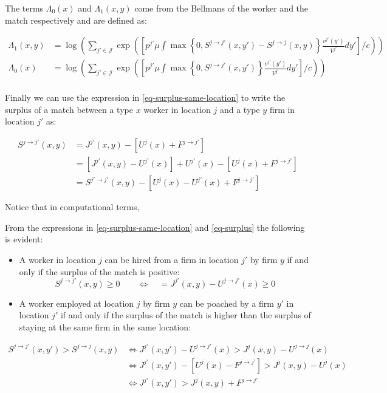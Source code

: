 \documentclass[
  letterpaper,
  DIV=11,
  numbers=noendperiod]{scrreprt}
\providecommand{\tightlist}{%
  \setlength{\itemsep}{0pt}\setlength{\parskip}{0pt}}\usepackage{longtable,booktabs,array}
\begin{document}
The terms \(\Lambda_0(x)\) and \(\Lambda_1(x,y)\) come from the Bellmans
of the worker and the match respectively and are defined as:

\begin{align*}
\Lambda_1(x, y) &= \log \left(\sum_{j'\in \mathcal{J}}\exp{\left(\left[p^{j'} \mu \int \max\left\{0, S^{j\to j' }(x,y')-S^{j \to j}(x,y) \right\}\frac{v^{ j' }(y')}{V^{j'}}dy' \right] / c\right)} \right)  \\
\Lambda_0(x) &= \log \left(\sum_{j'\in \mathcal{J}}\exp{\left(\left[p^{j'} \mu \int \max\left\{0, S^{j\to j' }(x,y') \right\}\frac{v^{ j' }(y')}{V^{j'}}dy' \right] / c\right)}\right) \\
\end{align*}

Finally we can use the expression in \eqref{eq-surplus-same-location} to
write the surplus of a match between a type \(x\) worker in location
\(j\) and a type \(y\) firm in location \(j'\) as:

\begin{align}\label{eq-surplus}
S^{j \to j'}(x,y) &= J^{j'}(x, y) - \left[U^{j}(x) + F^{j \to j'}\right] \\
& = [J^{j'}(x, y) - U^{j'}(x)] + U^{j'}(x) - \left[U^{j}(x) + F^{j \to j'}\right] \\
& = S^{j'\to j'}(x,y) - [U^{j}(x) - U^{j'}(x) + F^{j \to j'}]
\end{align}

Notice that in computational terms,

From the expressions in \eqref{eq-surplus-same-location} and
\eqref{eq-surplus} the following is evident:

\begin{itemize}
\tightlist
\item
  A worker in location \(j\) can be hired from a firm in location \(j'\)
  by firm \(y\) if and only if the surplus of the match is positive:
  \[S^{j\to j'}(x,y) \geq 0 \qquad \iff \quad = J^{j'}(x,y) - U^{j\to j'}(x) \geq 0\]
\item
  A worker employed at location \(j\) by firm \(y\) can be poached by a
  firm \(y'\) in location \(j'\) if and only if the surplus of the match
  is higher than the surplus of staying at the same firm in the same
  location:
\end{itemize}

\begin{align*}
S^{j\to j'}(x,y') > S^{j\to j}(x,y) &\iff J^{j'}(x,y') - U^{j\to j'}(x) > J^{j}(x,y) - U^{j\to j}(x) \\
&\iff J^{j'}(x,y') - [U^{j}(x) - F^{j\to j'}] > J^{j}(x,y) - U^{j}(x) \\
&\iff J^{j'}(x,y') > J^{j}(x,y) +  F^{j\to j'}
\end{align*}
\end{document}

